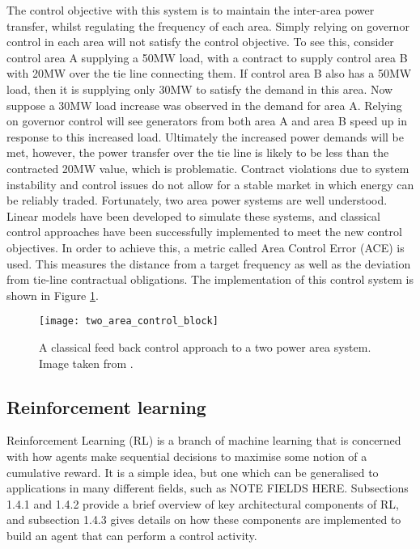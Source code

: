 The control objective with this system is to maintain the inter-area power transfer, whilst regulating the frequency of each area. Simply relying on governor control in each area will not satisfy the control objective. To see this, consider control area A supplying a 50MW load, with a contract to supply control area B with 20MW over the tie line connecting them. If control area B also has a 50MW load, then it is supplying only 30MW to satisfy the demand in this area. Now suppose a 30MW load increase was observed in the demand for area A. Relying on governor control will see generators from both area A and area B speed up in response to this increased load. Ultimately the increased power demands will be met, however, the power transfer over the tie line is likely to be less than the contracted 20MW value, which is problematic. Contract violations due to system instability and control issues do not allow for a stable market in which energy can be reliably traded. Fortunately, two area power systems are well understood. Linear models have been developed to simulate these systems, and classical control approaches have been successfully implemented to meet the new control objectives. In order to achieve this, a metric called Area Control Error (ACE) is used. This measures the distance from a target frequency as well as the deviation from tie-line contractual obligations. The implementation of this control system is shown in Figure \ref{fig:twoareacontrolblock}.

\begin{figure}[ht]
	\centering
	\texttt{[image: two\_area\_control\_block]}
	\caption{A classical feed back control approach to a two power area system. Image taken from \cite{Kothari2011}.}
	\label{fig:twoareacontrolblock}
\end{figure}


\subsection{Reinforcement learning}
Reinforcement Learning (RL) is a branch of machine learning that is concerned with how agents make sequential decisions to maximise some notion of a cumulative reward. It is a simple idea, but one which can be generalised to applications in many different fields, such as NOTE FIELDS HERE. Subsections 1.4.1 and 1.4.2 provide a brief overview of key architectural components of RL, and subsection 1.4.3 gives details on how these components are implemented to build an agent that can perform a control activity.

